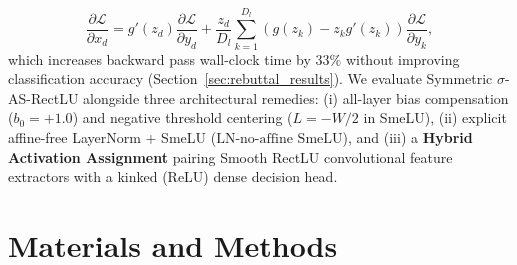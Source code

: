 \documentclass[10pt,a4paper]{article}
\begin{document}
\begin{equation}
    \frac{\partial \mathcal{L}}{\partial x_d} = g'(z_d)\frac{\partial \mathcal{L}}{\partial y_d} + \frac{z_d}{D_l}\sum_{k=1}^{D_l}\!\left(g(z_k) - z_k g'(z_k)\right)\frac{\partial \mathcal{L}}{\partial y_k},
    \label{eq:backward_jacobian}
\end{equation}
which increases backward pass wall-clock time by $33\%$ without improving classification accuracy (Section~\ref{sec:rebuttal_results}). We evaluate Symmetric $\sigma$-AS-RectLU alongside three architectural remedies: (i) all-layer bias compensation ($b_0 = +1.0$) and negative threshold centering ($L = -W/2$ in SmeLU), (ii) explicit affine-free LayerNorm + SmeLU ($\text{LN-no-affine SmeLU}$), and (iii) a \textbf{Hybrid Activation Assignment} pairing Smooth RectLU convolutional feature extractors with a kinked (ReLU) dense decision head.

\section{Materials and Methods}
\end{document}
